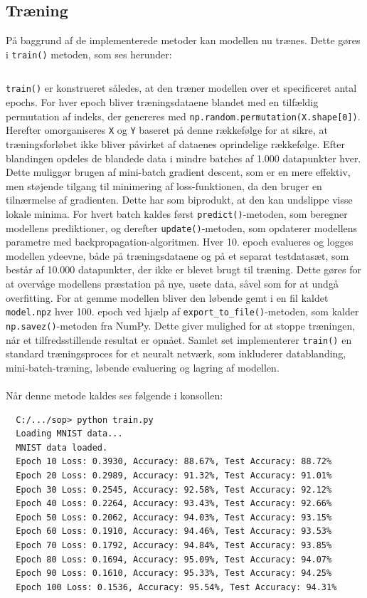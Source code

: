 \documentclass{article}
\begin{document}
\subsection{Træning}
På baggrund af de implementerede metoder kan modellen nu trænes. Dette gøres i \texttt{train()} metoden, som ses herunder:
\inputminted[firstline=63, lastline=80]{python}{train.py}\noindent
\texttt{train()} er konstrueret således, at den træner modellen over et specificeret antal epochs. For hver epoch bliver træningsdataene blandet med en tilfældig permutation af indeks, der genereres med \texttt{np.random.permutation(X.shape[0])}. Herefter omorganiseres \texttt{X} og \texttt{Y} baseret på denne rækkefølge for at sikre, at træningsforløbet ikke bliver påvirket af dataenes oprindelige rækkefølge. Efter blandingen opdeles de blandede data i mindre batches af 1.000 datapunkter hver. Dette muliggør brugen af mini-batch gradient descent, som er en mere effektiv, men støjende tilgang til minimering af loss-funktionen, da den bruger en tilnærmelse af gradienten. Dette har som biprodukt, at den kan undslippe visse lokale minima. For hvert batch kaldes først \texttt{predict()}-metoden, som beregner modellens prediktioner, og derefter \texttt{update()}-metoden, som opdaterer modellens parametre med backpropagation-algoritmen. Hver 10. epoch evalueres og logges modellen ydeevne, både på træningsdataene og på et separat testdatasæt, som består af 10.000 datapunkter, der ikke er blevet brugt til træning. Dette gøres for at overvåge modellens præstation på nye, usete data, såvel som for at undgå overfitting. For at gemme modellen bliver den løbende gemt i en fil kaldet \texttt{model.npz} hver 100. epoch ved hjælp af \texttt{export\_to\_file()}-metoden, som kalder \texttt{np.savez()}-metoden fra NumPy. Dette giver mulighed for at stoppe træningen, når et tilfredsstillende resultat er opnået. Samlet set implementerer \texttt{train()} en standard træningsproces for et neuralt netværk, som inkluderer datablanding, mini-batch-træning, løbende evaluering og lagring af modellen.\\\\
Når denne metode kaldes ses følgende i konsollen:
\begin{verbatim}
  C:/.../sop> python train.py
  Loading MNIST data...
  MNIST data loaded.
  Epoch 10 Loss: 0.3930, Accuracy: 88.67%, Test Accuracy: 88.72%
  Epoch 20 Loss: 0.2989, Accuracy: 91.32%, Test Accuracy: 91.01%
  Epoch 30 Loss: 0.2545, Accuracy: 92.58%, Test Accuracy: 92.12%
  Epoch 40 Loss: 0.2264, Accuracy: 93.43%, Test Accuracy: 92.66%
  Epoch 50 Loss: 0.2062, Accuracy: 94.03%, Test Accuracy: 93.15%
  Epoch 60 Loss: 0.1910, Accuracy: 94.46%, Test Accuracy: 93.53%
  Epoch 70 Loss: 0.1792, Accuracy: 94.84%, Test Accuracy: 93.85%
  Epoch 80 Loss: 0.1694, Accuracy: 95.09%, Test Accuracy: 94.07%
  Epoch 90 Loss: 0.1610, Accuracy: 95.33%, Test Accuracy: 94.25%
  Epoch 100 Loss: 0.1536, Accuracy: 95.54%, Test Accuracy: 94.31%
\end{verbatim}
\end{document}

